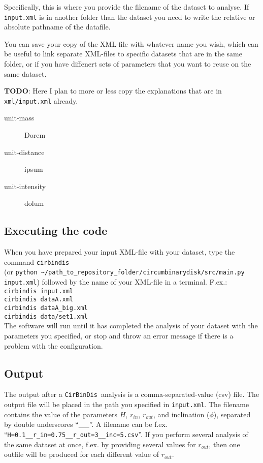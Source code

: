 \documentclass[a4paper, 12pt, english, titlepage]{article}
\newcommand{\sname}{\texttt{CirBinDis }}
\begin{document}
    Specifically, this is where you provide the filename of the dataset to analyse.
    If \texttt{input.xml} is in another folder than the dataset you need to write the relative or absolute pathname of the datafile.

    You can save your copy of the XML-file with whatever name you wish, which can be useful to link separate XML-files to specific datasets that are in the same folder, or if you have diffenert sets of parameters that you want to reuse on the same dataset.

    \textbf{TODO}: Here I plan to more or less copy the explanations that are in \texttt{xml/input.xml} already.

    \begin{description}
        \item[unit-mass] Dorem
        \item[unit-distance] ipsum
        \item[unit-intensity] dolum
    \end{description}

\subsection{Executing the code}
    When you have prepared your input XML-file with your dataset, type the command \texttt{cirbindis} \\
    (or \texttt{python \textasciitilde/path\_to\_repository\_folder/circumbinarydisk/src/main.py input.xml})
    followed by the name of your XML-file in a terminal.
    F.ex.: \\
    \texttt{cirbindis input.xml} \\
    \texttt{cirbindis dataA.xml} \\
    \texttt{cirbindis dataA\_big.xml} \\
    \texttt{cirbindis data/set1.xml} \\
    The software will run until it has completed the analysis of your dataset with the parameters you specified, or stop and throw an error message if there is a problem with the configuration.

\subsection{Output}
    The output after a \sname analysis is a comma-separated-value (csv) file. The output file will be placed in the path you specified in \texttt{input.xml}. The filename contains the value of the parameters $H$, $r_{in}$, $r_{out}$, and inclination ($\phi$), separated by double underscores ``\_\_''. A filename can be f.ex.
    ``\texttt{H=0.1\_\_r\_in=0.75\_\_r\_out=3\_\_inc=5.csv}''.
    If you perform several analysis of the same dataset at once, f.ex. by providing several values for $r_{out}$, then one outfile will be produced for each different value of $r_{out}$.
\end{document}
